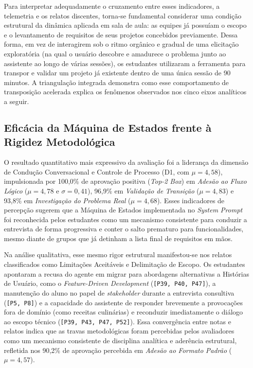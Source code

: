 Para interpretar adequadamente o cruzamento entre esses indicadores, a telemetria e os relatos discentes, torna-se fundamental considerar uma condição estrutural da dinâmica aplicada em sala de aula: as equipes já possuíam o escopo e o levantamento de requisitos de seus projetos concebidos previamente. Dessa forma, em vez de interagirem sob o ritmo orgânico e gradual de uma elicitação exploratória (na qual o usuário descobre e amadurece o problema junto ao assistente ao longo de várias sessões), os estudantes utilizaram a ferramenta para transpor e validar um projeto já existente dentro de uma única sessão de 90 minutos. A triangulação integrada demonstra como esse comportamento de transposição acelerada explica os fenômenos observados nos cinco eixos analíticos a seguir.

\subsection{Eficácia da Máquina de Estados frente à Rigidez Metodológica}

O resultado quantitativo mais expressivo da avaliação foi a liderança da dimensão de Condução Conversacional e Controle de Processo (D1, com $\mu = 4,58$), impulsionada por 100,0\% de aprovação positiva (\textit{Top-2 Box}) em \textit{Adesão ao Fluxo Lógico} ($\mu = 4,78$ e $\sigma = 0,41$), 96,9\% em \textit{Validação de Transição} ($\mu = 4,83$) e 93,8\% em \textit{Investigação do Problema Real} ($\mu = 4,68$). Esses indicadores de percepção sugerem que a Máquina de Estados implementada no \textit{System Prompt} foi reconhecida pelos estudantes como um mecanismo consistente para conduzir a entrevista de forma progressiva e conter o salto prematuro para funcionalidades, mesmo diante de grupos que já detinham a lista final de requisitos em mãos.

Na análise qualitativa, esse mesmo rigor estrutural manifestou-se nos relatos classificados como Limitações Aceitáveis e Delimitação de Escopo. Os estudantes apontaram a recusa do agente em migrar para abordagens alternativas a Histórias de Usuário, como o \textit{Feature-Driven Development} (\texttt{[P39, P40, P47]}), a manutenção do aluno no papel de \textit{stakeholder} durante a entrevista consultiva (\texttt{[P5, P8]}) e a capacidade do assistente de responder brevemente a provocações fora de domínio (como receitas culinárias) e reconduzir imediatamente o diálogo ao escopo técnico (\texttt{[P39, P43, P47, P52]}). Essa convergência entre notas e relatos indica que as travas metodológicas foram percebidas pelos avaliadores como um mecanismo consistente de disciplina analítica e aderência estrutural, refletida nos 90,2\% de aprovação percebida em \textit{Adesão ao Formato Padrão} ($\mu = 4,57$).

